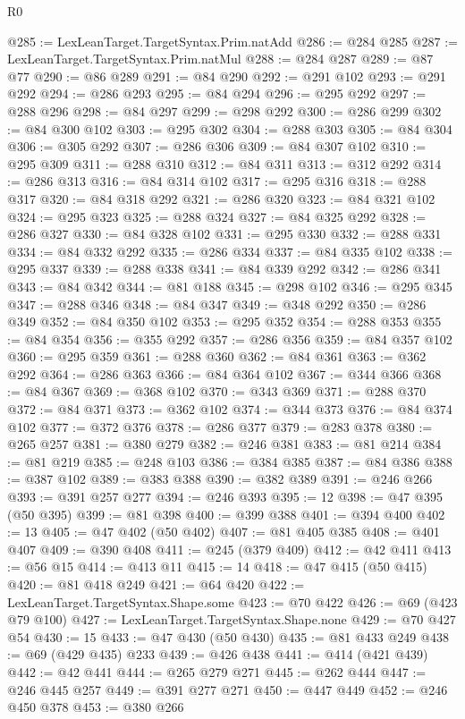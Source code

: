 \begin{lexlean}{R0}
\begin{coremodule}
@285 := LexLeanTarget.TargetSyntax.Prim.natAdd
@286 := @284 @285
@287 := LexLeanTarget.TargetSyntax.Prim.natMul
@288 := @284 @287
@289 := @87 @77
@290 := @86 @289
@291 := @84 @290
@292 := @291 @102
@293 := @291 @292
@294 := @286 @293
@295 := @84 @294
@296 := @295 @292
@297 := @288 @296
@298 := @84 @297
@299 := @298 @292
@300 := @286 @299
@302 := @84 @300 @102
@303 := @295 @302
@304 := @288 @303
@305 := @84 @304
@306 := @305 @292
@307 := @286 @306
@309 := @84 @307 @102
@310 := @295 @309
@311 := @288 @310
@312 := @84 @311
@313 := @312 @292
@314 := @286 @313
@316 := @84 @314 @102
@317 := @295 @316
@318 := @288 @317
@320 := @84 @318 @292
@321 := @286 @320
@323 := @84 @321 @102
@324 := @295 @323
@325 := @288 @324
@327 := @84 @325 @292
@328 := @286 @327
@330 := @84 @328 @102
@331 := @295 @330
@332 := @288 @331
@334 := @84 @332 @292
@335 := @286 @334
@337 := @84 @335 @102
@338 := @295 @337
@339 := @288 @338
@341 := @84 @339 @292
@342 := @286 @341
@343 := @84 @342
@344 := @81 @188
@345 := @298 @102
@346 := @295 @345
@347 := @288 @346
@348 := @84 @347
@349 := @348 @292
@350 := @286 @349
@352 := @84 @350 @102
@353 := @295 @352
@354 := @288 @353
@355 := @84 @354
@356 := @355 @292
@357 := @286 @356
@359 := @84 @357 @102
@360 := @295 @359
@361 := @288 @360
@362 := @84 @361
@363 := @362 @292
@364 := @286 @363
@366 := @84 @364 @102
@367 := @344 @366
@368 := @84 @367
@369 := @368 @102
@370 := @343 @369
@371 := @288 @370
@372 := @84 @371
@373 := @362 @102
@374 := @344 @373
@376 := @84 @374 @102
@377 := @372 @376
@378 := @286 @377
@379 := @283 @378
@380 := @265 @257
@381 := @380 @279
@382 := @246 @381
@383 := @81 @214
@384 := @81 @219
@385 := @248 @103
@386 := @384 @385
@387 := @84 @386
@388 := @387 @102
@389 := @383 @388
@390 := @382 @389
@391 := @246 @266
@393 := @391 @257 @277
@394 := @246 @393
@395 := 12
@398 := @47 @395 (@50 @395)
@399 := @81 @398
@400 := @399 @388
@401 := @394 @400
@402 := 13
@405 := @47 @402 (@50 @402)
@407 := @81 @405 @385
@408 := @401 @407
@409 := @390 @408
@411 := @245 (@379 @409)
@412 := @42 @411
@413 := @56 @15
@414 := @413 @11
@415 := 14
@418 := @47 @415 (@50 @415)
@420 := @81 @418 @249
@421 := @64 @420
@422 := LexLeanTarget.TargetSyntax.Shape.some
@423 := @70 @422
@426 := @69 (@423 @79 @100)
@427 := LexLeanTarget.TargetSyntax.Shape.none
@429 := @70 @427 @54
@430 := 15
@433 := @47 @430 (@50 @430)
@435 := @81 @433 @249
@438 := @69 (@429 @435) @233
@439 := @426 @438
@441 := @414 (@421 @439)
@442 := @42 @441
@444 := @265 @279 @271
@445 := @262 @444
@447 := @246 @445 @257
@449 := @391 @277 @271
@450 := @447 @449
@452 := @246 @450 @378
@453 := @380 @266

\end{coremodule}
\end{lexlean}
